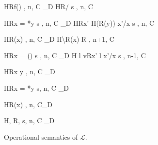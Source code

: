 \begin{figure}
\begin{minipage}{\textwidth}
\vspace{2mm}

{ \langle H\coma R\coma  f() , n, C\rangle
  \longrightarrow_{D}
  \langle H\coma R\coma  \Lb {}/ \Rb s , n, C\rangle}

\vspace{2mm}


\vspace{2mm}

{\langle H\coma R\coma  \LET x = *y \; \IN s , n, C\rangle
  \longrightarrow_{D}
  \langle H\coma R\Lfc x' \mapsto H(R(y)) \Rfc \coma   \Lb x'/x \Rb s , n, C\rangle }

\vspace{2mm}

{\langle H\coma R\coma \Free(x) , n, C \rangle \xlongrightarrow{\Free}_{D}
  \langle H\backslash R(x) \coma R \coma \SKIP , n+1, C \rangle}

\vspace{2mm}

{\langle H\coma R\coma  \LET x = \Malloc() \; \IN s , n, C\rangle
  \xlongrightarrow{\Malloc}_{D}
  \langle H \Lfc l \mapsto v\Rfc \coma R\Lfc x' \mapsto l \Rfc \coma   \Lb x'/x \Rb s , n-1, C  \rangle }

\vspace{2mm}

\begin{minipage}{0.5\textwidth}
{\langle H\coma R\coma  *x \leftarrow y , n, C\rangle
  \longrightarrow_{D} \MEMEX }
\end{minipage}
\begin{minipage}{0.5\textwidth}
{\langle H\coma R\coma  \LET x = *y \; \IN s, n, C\rangle
    \longrightarrow_{D} \MEMEX}
\end{minipage}

{\langle H\coma R\coma \Free(x) , n, C\rangle \xlongrightarrow{\Free}_{D} \MEMEX}

{\langle H, R, \scon\Sirx s, n, C \rangle \xlongrightarrow{\rho}_{D} \CONSTEX }


\end{minipage}

\caption{Operational semantics of \(\mathcal{L}\).}
\label{fig:transitionRules}
\end{figure}
